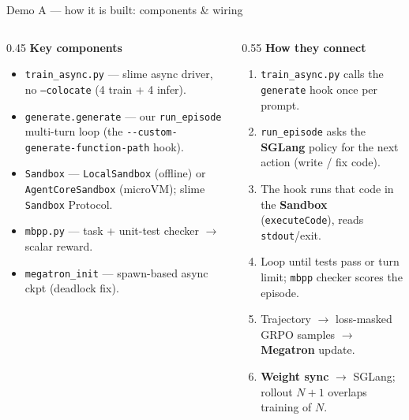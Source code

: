 \documentclass[aspectratio=169]{beamer}
\begin{document}
\begin{frame}{Demo A --- how it is built: components \& wiring}
  \begin{columns}[T]
    \begin{column}{0.45\textwidth}
      \scriptsize\textbf{Key components}
      \begin{itemize}\setlength\itemsep{0.15em}
        \item \texttt{train\_async.py} --- slime async driver, no \texttt{--colocate} (4 train + 4 infer).
        \item \texttt{generate.generate} --- our \texttt{run\_episode} multi-turn loop (the \texttt{-{}-custom-generate-function-path} hook).
        \item \texttt{Sandbox} --- \texttt{LocalSandbox} (offline) or \texttt{AgentCoreSandbox} (microVM); slime \texttt{Sandbox} Protocol.
        \item \texttt{mbpp.py} --- task + unit-test checker $\to$ scalar reward.
        \item \texttt{megatron\_init} --- spawn-based async ckpt (deadlock fix).
      \end{itemize}
    \end{column}
    \begin{column}{0.55\textwidth}
      \scriptsize\textbf{How they connect}
      \begin{enumerate}\setlength\itemsep{0.15em}
        \item \texttt{train\_async.py} calls the \texttt{generate} hook once per prompt.
        \item \texttt{run\_episode} asks the \textbf{SGLang} policy for the next action (write / fix code).
        \item The hook runs that code in the \textbf{Sandbox} (\texttt{executeCode}), reads \texttt{stdout}/exit.
        \item Loop until tests pass or turn limit; \texttt{mbpp} checker scores the episode.
        \item Trajectory $\to$ loss-masked GRPO samples $\to$ \textbf{Megatron} update.
        \item \textbf{Weight sync} $\to$ SGLang; rollout $N{+}1$ overlaps training of $N$.
      \end{enumerate}
    \end{column}
  \end{columns}
\end{frame}
\end{document}
